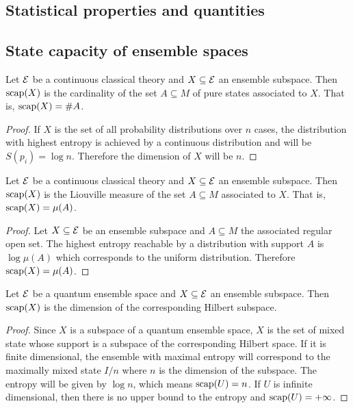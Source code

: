 \subsection{Statistical properties and quantities}



\subsection{State capacity of ensemble spaces}


\begin{prop}
	Let $\mathcal{E}$ be a continuous classical theory and $X \subseteq \mathcal{E}$ an ensemble subspace. Then $\mathrm{scap}(X)$ is the cardinality of the set $A \subseteq M$ of pure states associated to $X$. That is, $\mathrm{scap}(X) = \#A$.
\end{prop}

\begin{proof}
	If $X$ is the set of all probability distributions over $n$ cases, the distribution with highest entropy is achieved by a continuous distribution and will be $S(p_i) = \log n$. Therefore the dimension of $X$ will be $n$.
\end{proof}

\begin{prop}
	Let $\mathcal{E}$ be a continuous classical theory and $X \subseteq \mathcal{E}$ an ensemble subspace. Then $\mathrm{scap}(X)$ is the Liouville measure of the set $A \subseteq M$ associated to $X$. That is, $\mathrm{scap}(X) = \mu(A)$.
\end{prop}

\begin{proof}
	Let $X \subseteq \mathcal{E}$ be an ensemble subspace and $A \subseteq M$ the associated regular open set. The highest entropy reachable by a distribution with support $A$ is $\log \mu(A)$ which corresponds to the uniform distribution. Therefore $\mathrm{scap}(X) = \mu(A)$.
\end{proof}

\begin{prop}
	Let $\mathcal{E}$ be a quantum ensemble space and $X \subseteq \mathcal{E}$ an ensemble subspace. Then $\mathrm{scap}(X)$ is the dimension of the corresponding Hilbert subspace.
\end{prop}

\begin{proof}
	Since $X$ is a subspace of a quantum ensemble space, $X$ is the set of mixed state whose support is a subspace of the corresponding Hilbert space. If it is finite dimensional, the ensemble with maximal entropy will correspond to the maximally mixed state $I/n$ where $n$ is the dimension of the subspace. The entropy will be given by $\log n$, which means $\mathrm{scap}(U) = n$. If $U$ is infinite dimensional, then there is no upper bound to the entropy and $\mathrm{scap}(U) = + \infty$.
\end{proof}

